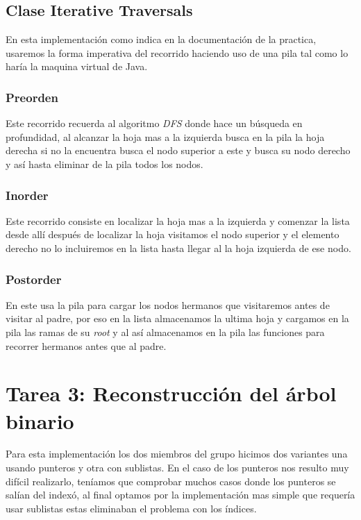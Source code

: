 \documentclass{article}
\begin{document}
       \subsection{Clase Iterative Traversals}

            En esta implementación como indica en la documentación de la
            practica, usaremos la forma imperativa del recorrido haciendo uso
            de una pila tal como lo haría la maquina virtual de Java.
        \subsubsection{Preorden}
        Este recorrido recuerda al algoritmo \textit{DFS} donde hace un búsqueda
        en profundidad, al alcanzar la hoja mas a la izquierda busca en la pila
        la hoja derecha si no la encuentra busca el nodo superior a este y busca
        su nodo derecho y así hasta eliminar de la pila todos los nodos.
        \subsubsection{Inorder}
        Este recorrido consiste en localizar la hoja mas a la izquierda y
        comenzar la lista desde allí después de localizar la hoja visitamos el
        nodo superior y el elemento derecho no lo incluiremos en la lista hasta
        llegar al la hoja izquierda de ese nodo.
        \subsubsection{Postorder}
        En este usa la pila para cargar los nodos hermanos que visitaremos antes
        de visitar al padre, por eso en la lista almacenamos la ultima hoja y
        cargamos en la pila las ramas de su \textit{root} y al así almacenamos
        en la pila las funciones para recorrer hermanos antes que al padre.

\section{Tarea 3: Reconstrucción del árbol binario}
Para esta implementación los dos miembros del grupo hicimos dos variantes una
usando punteros y otra con sublistas. En el caso de los punteros nos resulto muy
difícil realizarlo, teníamos que comprobar muchos casos donde los punteros se
salían del indexó, al final optamos por la implementación mas simple que requería
usar sublistas estas eliminaban el problema con los índices.
\end{document}
